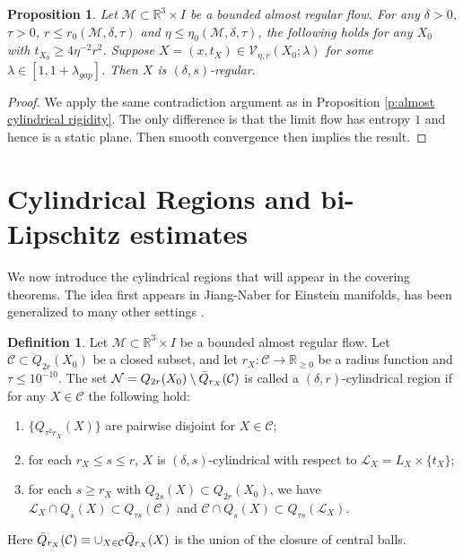 \documentclass[11pt,reqno]{amsart}
\numberwithin{equation}{section}
\newcommand{\RR}{\mathds{R}}
\newcommand{\cC}{\mathcal{C}}
\newcommand{\cM}{\mathcal{M}}
\newcommand{\cV}{\mathcal{V}}
\newtheorem{proposition}[equation]{Proposition}
\theoremstyle{definition}
\newtheorem{definition}[equation]{Definition}
\theoremstyle{remark}
\theoremstyle{remark}
\theoremstyle{remark}
\theoremstyle{remark}\newtheorem{conjecture}[equation]{Conjecture}
\theoremstyle{remark}\newtheorem{question}[equation]{Question}
\begin{document}
\begin{proposition}\label{p:almost regular rigidity}
    Let $\cM \subset \RR^3 \times I$ be a bounded almost regular flow. For any $\delta>0$, $\tau>0$, $r\le r_0(\cM,\delta,\tau)$  and $\eta\le \eta_0(\cM,\delta,\tau)$, the following holds for any $X_0$ with $t_{X_0} \ge 4\eta^{-2}r^2$. Suppose $ X = (x,t_X)\in \cV_{\eta,r}(X_0;\lambda)$ for some $\lambda \in [1, 1+  \lambda_{gap}]$. Then $X$ is $(\delta,s)$-regular. 
\end{proposition}

\begin{proof}
    We apply the same contradiction argument as in Proposition \ref{p:almost cylindrical rigidity}. The only difference is that the limit flow has entropy $1$ and hence is a static plane. Then smooth convergence then implies the result. 
\end{proof}













\section{Cylindrical Regions and bi-Lipschitz estimates}



We now introduce the cylindrical regions that will appear in the covering theorems. The idea first appears in Jiang-Naber \cite{JN21} for Einstein manifolds, has been generalized to many other settings \cite{NV19,CJN21,BNS22,NV24}.

\begin{definition}\label{d:cylindricalregion}
Let $\cM \subset \RR^3 \times I$ be a bounded almost regular flow. Let $\mathcal{C} \subset Q_{2r}(X_0)$ be a closed subset, and let $r_X : \mathcal{C} \rightarrow \RR_{\ge0}$ be a radius function and $\tau \le 10^{-10}$. The set $\mathcal{N} = Q_{2r}(X_0) \setminus \Bar{Q}_{r_X}(\cC)$ is called a $(\delta, r)$-cylindrical region if for any $X\in \cC$ the following hold:
\begin{enumerate}
    \item $\{Q_{\tau^2 r_X}(X) \}$ are pairwise disjoint for $X\in \cC$;
    \item for each $r_X \leq s \leq r $, $X$ is $
    (\delta,s)$-cylindrical with respect to $\mathcal{L}_{X} = L_X \times \{t_X\}$;
    \item for each $s \geq r_X$ with $Q_{2s}(X)\subset Q_{2r}(X_0)$, we have $\mathcal{L}_{X} \cap Q_s(X) \subset Q_{\tau s}(\mathcal{C})$ and $\mathcal{C} \cap Q_s(X) \subset Q_{\tau s}(\mathcal{L}_{X})$.
\end{enumerate}
Here $\Bar{Q}_{r_X}(\cC) \equiv \cup_{X\in \cC}\bar Q_{r_X}(X)$ is the union of the closure of central balls. 
\end{definition}
\end{document}
